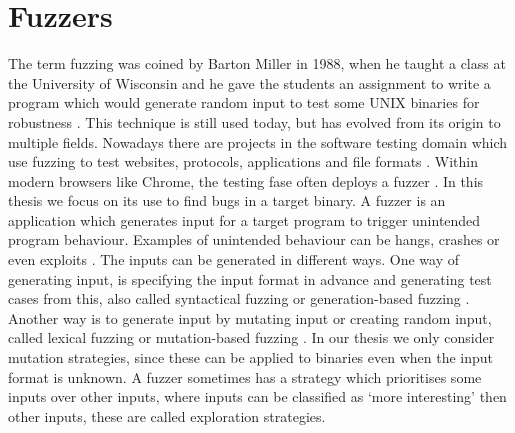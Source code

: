 \section{Fuzzers}\label{sec:fuzzing}
The term fuzzing was coined by Barton Miller in 1988, when he taught a class at the University of Wisconsin and he gave the students an assignment to write a program which would generate random input to test some UNIX binaries for robustness \cite{takanen2018fuzzing}. This technique is still used today, but has evolved from its origin to multiple fields. Nowadays there are projects in the software testing domain which use fuzzing to test websites, protocols, applications and file formats \cite{owaspfuzzing}. Within modern browsers like Chrome, the testing fase often deploys a fuzzer \cite{aizatsky2016ossfuzz}. In this thesis we focus on its use to find bugs in a target binary. A fuzzer is an application which generates input for a target program to trigger unintended program behaviour. Examples of unintended behaviour can be hangs, crashes or even exploits \cite{chen2018angora}. The inputs can be generated in different ways. One way of generating input, is specifying the input format in advance and generating test cases from this, also called syntactical fuzzing or generation-based fuzzing \cite{zeller2019fuzzing}. Another way is to generate input by mutating input or creating random input, called lexical fuzzing or mutation-based fuzzing \cite{rawat2017vuzzer}. In our thesis we only consider mutation strategies, since these can be applied to binaries even when the input format is unknown.
A fuzzer sometimes has a strategy which prioritises some inputs over other inputs, where inputs can be classified as `more interesting' then other inputs, these are called exploration strategies. %

